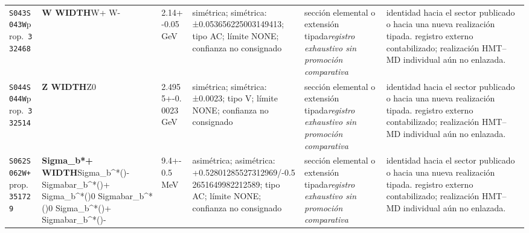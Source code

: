 \begin{landscape}
\begin{longtable}{L{1.85cm}L{4.45cm}L{2.35cm}L{4.05cm}L{3.35cm}L{7.15cm}}
\texttt{S043}\newline \texttt{S043W}\newline prop.\ \texttt{332468} & \textbf{W WIDTH}\newline W+ \textbar{}\allowbreak{} W- & 2.14+-0.05\,GeV & simétrica; simétrica: ±0.053656225003149413; tipo AC; límite NONE; confianza no consignado & sección elemental o extensión tipada\newline \emph{registro exhaustivo sin promoción comparativa} & identidad hacia el sector publicado o hacia una nueva realización tipada. registro externo contabilizado; realización HMT--MD individual aún no enlazada. \\
\texttt{S044}\newline \texttt{S044W}\newline prop.\ \texttt{332514} & \textbf{Z WIDTH}\newline Z0 & 2.4955+-0.0023\,GeV & simétrica; simétrica: ±0.0023; tipo V; límite NONE; confianza no consignado & sección elemental o extensión tipada\newline \emph{registro exhaustivo sin promoción comparativa} & identidad hacia el sector publicado o hacia una nueva realización tipada. registro externo contabilizado; realización HMT--MD individual aún no enlazada. \\
\texttt{S062}\newline \texttt{S062W+}\newline prop.\ \texttt{351729} & \textbf{Sigma\_\allowbreak{}b*+ WIDTH}\newline Sigma\_\allowbreak{}b\textasciicircum{}*()- \textbar{}\allowbreak{} Sigmabar\_\allowbreak{}b\textasciicircum{}*()+ \textbar{}\allowbreak{} Sigma\_\allowbreak{}b\textasciicircum{}*()0 \textbar{}\allowbreak{} Sigmabar\_\allowbreak{}b\textasciicircum{}*()0 \textbar{}\allowbreak{} Sigma\_\allowbreak{}b\textasciicircum{}*()+ \textbar{}\allowbreak{} Sigmabar\_\allowbreak{}b\textasciicircum{}*()- & 9.4+-0.5\,MeV & asimétrica; asimétrica: +0.52801285527312969/-0.52651649982212589; tipo AC; límite NONE; confianza no consignado & sección elemental o extensión tipada\newline \emph{registro exhaustivo sin promoción comparativa} & identidad hacia el sector publicado o hacia una nueva realización tipada. registro externo contabilizado; realización HMT--MD individual aún no enlazada. \\

\end{longtable}
\end{landscape}
